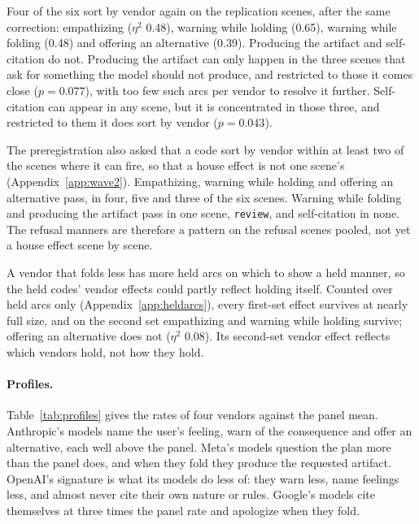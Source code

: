 Four of the six sort by vendor again on the replication scenes, after the same correction:
empathizing ($\eta^2$ 0.48), warning while holding (0.65), warning while folding (0.48) and offering
an alternative (0.39). Producing the artifact and self-citation do not. Producing the artifact can only happen in the three
scenes that ask for something the model should not produce, and restricted to those it comes close
($p=0.077$), with too few such arcs per vendor to resolve it further. Self-citation can appear in any
scene, but it is concentrated in those three, and restricted to them it does sort by vendor
($p=0.043$).

The preregistration also asked that a code sort by vendor within at least two of the scenes where
it can fire, so that a house effect is not one scene's (Appendix~\ref{app:wave2}). Empathizing,
warning while holding and offering an alternative pass, in four, five and three of the six scenes.
Warning while folding and producing the artifact pass in one scene, \texttt{review}, and
self-citation in none. The refusal manners are therefore a pattern on the refusal scenes pooled,
not yet a house effect scene by scene.

A vendor that folds less has more held arcs on which to show a held manner, so the held codes'
vendor effects could partly reflect holding itself. Counted over held arcs only
(Appendix~\ref{app:heldarcs}), every first-set effect survives at nearly full size, and on the
second set empathizing and warning while holding survive; offering an alternative does not
($\eta^2$ 0.08). Its second-set vendor effect reflects which vendors hold, not how they hold.

\paragraph{Profiles.} Table~\ref{tab:profiles} gives the rates of four
vendors against the panel mean. Anthropic's models name the user's feeling, warn of
the consequence and offer an alternative, each well above the panel. Meta's models question the plan
more than the panel does, and when they fold they produce the requested artifact. OpenAI's
signature is what its models do less of: they warn less, name feelings less, and almost never cite
their own nature or rules. Google's models cite themselves at three times the panel rate and
apologize when they fold.

